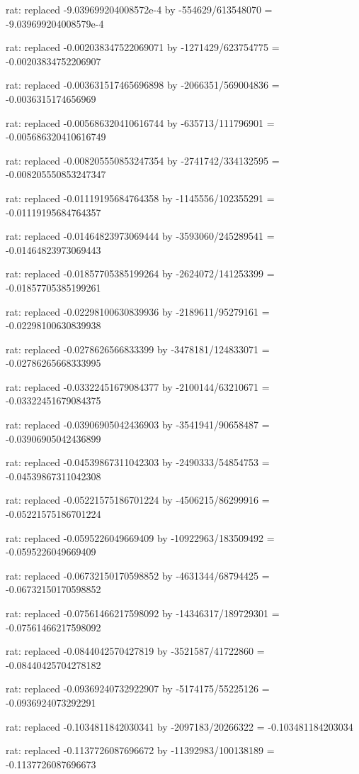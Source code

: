 \documentclass[a4paper,10pt]{article}
\begin{document}
\begin{eulernotebook}
\begin{eulercomment}
\begin{eulercomment}
\begin{eulercomment}
\begin{eulercomment}
\begin{eulercomment}
\begin{eulercomment}
\begin{eulercomment}
\begin{eulercomment}
\begin{eulercomment}
\begin{eulercomment}
\begin{eulercomment}
\begin{eulercomment}
\begin{eulercomment}
\begin{eulercomment}
\begin{eulercomment}
\begin{eulercomment}
\begin{euleroutput}
  rat: replaced -9.039699204008572e-4 by -554629/613548070 = -9.039699204008579e-4
  
  rat: replaced -0.002038347522069071 by -1271429/623754775 = -0.00203834752206907
  
  rat: replaced -0.003631517465696898 by -2066351/569004836 = -0.0036315174656969
  
  rat: replaced -0.005686320410616744 by -635713/111796901 = -0.005686320410616749
  
  rat: replaced -0.008205550853247354 by -2741742/334132595 = -0.008205550853247347
  
  rat: replaced -0.01119195684764358 by -1145556/102355291 = -0.01119195684764357
  
  rat: replaced -0.01464823973069444 by -3593060/245289541 = -0.01464823973069443
  
  rat: replaced -0.01857705385199264 by -2624072/141253399 = -0.01857705385199261
  
  rat: replaced -0.02298100630839936 by -2189611/95279161 = -0.02298100630839938
  
  rat: replaced -0.0278626566833399 by -3478181/124833071 = -0.02786265668333995
  
  rat: replaced -0.03322451679084377 by -2100144/63210671 = -0.03322451679084375
  
  rat: replaced -0.03906905042436903 by -3541941/90658487 = -0.03906905042436899
  
  rat: replaced -0.04539867311042303 by -2490333/54854753 = -0.04539867311042308
  
  rat: replaced -0.05221575186701224 by -4506215/86299916 = -0.05221575186701224
  
  rat: replaced -0.0595226049669409 by -10922963/183509492 = -0.0595226049669409
  
  rat: replaced -0.06732150170598852 by -4631344/68794425 = -0.06732150170598852
  
  rat: replaced -0.07561466217598092 by -14346317/189729301 = -0.07561466217598092
  
  rat: replaced -0.0844042570427819 by -3521587/41722860 = -0.08440425704278182
  
  rat: replaced -0.09369240732922907 by -5174175/55225126 = -0.0936924073292291
  
  rat: replaced -0.1034811842030341 by -2097183/20266322 = -0.103481184203034
  
  rat: replaced -0.1137726087696672 by -11392983/100138189 = -0.1137726087696673
  

\end{euleroutput}
\end{eulercomment}
\end{eulercomment}
\end{eulercomment}
\end{eulercomment}
\end{eulercomment}
\end{eulercomment}
\end{eulercomment}
\end{eulercomment}
\end{eulercomment}
\end{eulercomment}
\end{eulercomment}
\end{eulercomment}
\end{eulercomment}
\end{eulercomment}
\end{eulercomment}
\end{eulercomment}
\end{eulernotebook}
\end{document}
